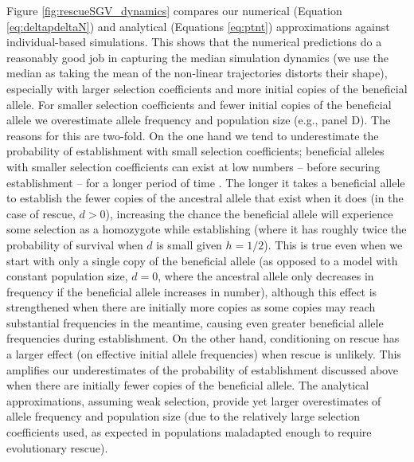 \documentclass[]{article}
\begin{document}
Figure \ref{fig:rescueSGV_dynamics} compares our numerical (Equation \ref{eq:deltapdeltaN}) and analytical (Equations \ref{eq:ptnt}) approximations against individual-based simulations.
This shows that the numerical predictions do a reasonably good job in capturing the median simulation dynamics (we use the median as taking the mean of the non-linear trajectories distorts their shape), especially with larger selection coefficients and more initial copies of the beneficial allele.
For smaller selection coefficients and fewer initial copies of the beneficial allele we overestimate allele frequency and population size (e.g., panel D).
The reasons for this are two-fold.
On the one hand we tend to underestimate the probability of establishment with small selection coefficients; beneficial alleles with smaller selection coefficients can exist at low numbers -- before securing establishment -- for a longer period of time \citep[][e.g., with $s=0.13$ and $d=0.05$ we have $W_{Aa} \approx 1.01$, so that such an allele can persist for up to $\sim(W_{Aa}-1)^{-1} \approx 100$ generations before establishing or going extinct, \citealp{desai2007beneficial}]{maruyama1974note}.
The longer it takes a beneficial allele to establish the fewer copies of the ancestral allele that exist when it does (in the case of rescue, $d>0$), increasing the chance the beneficial allele will experience some selection as a homozygote while establishing (where it has roughly twice the probability of survival when $d$ is small given $h=1/2$). 
This is true even when we start with only a single copy of the beneficial allele (as opposed to a model with constant population size, $d=0$, where the ancestral allele only decreases in frequency if the beneficial allele increases in number), although this effect is strengthened when there are initially more copies as some copies may reach substantial frequencies in the meantime, causing even greater beneficial allele frequencies during establishment.
On the other hand, conditioning on rescue has a larger effect (on effective initial allele frequencies) when rescue is unlikely.
This amplifies our underestimates of the probability of establishment discussed above when there are initially fewer copies of the beneficial allele.
The analytical approximations, assuming weak selection, provide yet larger overestimates of allele frequency and population size (due to the relatively large selection coefficients used, as expected in populations maladapted enough to require evolutionary rescue).
\end{document}
